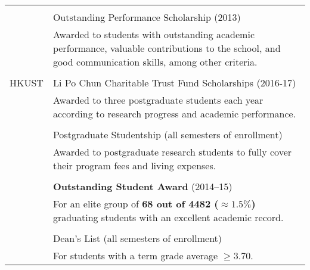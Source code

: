 \documentclass[10pt, oneside]{article}
\def \b {\textbf}
\begin{document}
\begin{tabularx}{\linewidth}{p{2.2cm}|p{16cm}}
	\\\\
	& Outstanding Performance Scholarship (2013) \\
	& \small{Awarded to students with outstanding academic performance, valuable contributions to the school, and good communication skills, among other criteria.}
	\\\\
	HKUST 
	& Li Po Chun Charitable Trust Fund Scholarships (2016-17)\\
	&	\small{Awarded to three postgraduate students each year according to research progress and academic performance.}
\\\\
	& Postgraduate Studentship (all semesters of enrollment)\\
	& \small{Awarded to postgraduate research students to fully cover their program fees and living expenses.}
	\\\\
	& \textbf{Outstanding Student Award} (2014--15)\\
	& \small{For an elite group of \b{68 out of 4482 ($\approx 1.5\%$)} graduating students  with an excellent academic record.}
	\\\\
	& Dean's List (all semesters of enrollment)\\
	&\small{For students with a term grade average $\ge3.70$.}
	\\

\end{tabularx}
\end{document}
